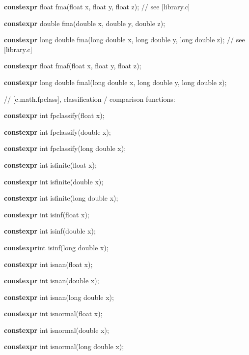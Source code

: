 \documentclass[prd,preprint,amsmath,amssymb,nofootinbib,eqsecnum]{revtex4-1}
\newcommand{\highlight}[1]{{\bf #1}}
\begin{document}
{\vspace{2ex}

\highlight{constexpr}  float fma(float x, float y, float z); // see [library.c]

\highlight{constexpr}  double fma(double x, double y, double z);

\highlight{constexpr}  long double fma(long double x, long double y, long double z); // see [library.c]

\highlight{constexpr}  float fmaf(float x, float y, float z);

\highlight{constexpr}  long double fmal(long double x, long double y, long double z);

\vspace{2ex}

// [c.math.fpclass], classification / comparison functions:

\highlight{constexpr} int fpclassify(float x);

\highlight{constexpr} int fpclassify(double x);

\highlight{constexpr} int fpclassify(long double x);

\vspace{2ex}

\highlight{constexpr} int isfinite(float x);

\highlight{constexpr} int isfinite(double x);

\highlight{constexpr} int isfinite(long double x);

\vspace{2ex}

\highlight{constexpr} int isinf(float x);

\highlight{constexpr} int isinf(double x);

\highlight{constexpr}int isinf(long double x);

\vspace{2ex}

\highlight{constexpr} int isnan(float x);

\highlight{constexpr} int isnan(double x);

\highlight{constexpr} int isnan(long double x);

\vspace{2ex}

\highlight{constexpr} int isnormal(float x);

\highlight{constexpr} int isnormal(double x);

\highlight{constexpr} int isnormal(long double x);

\vspace{2ex}

}
\end{document}
